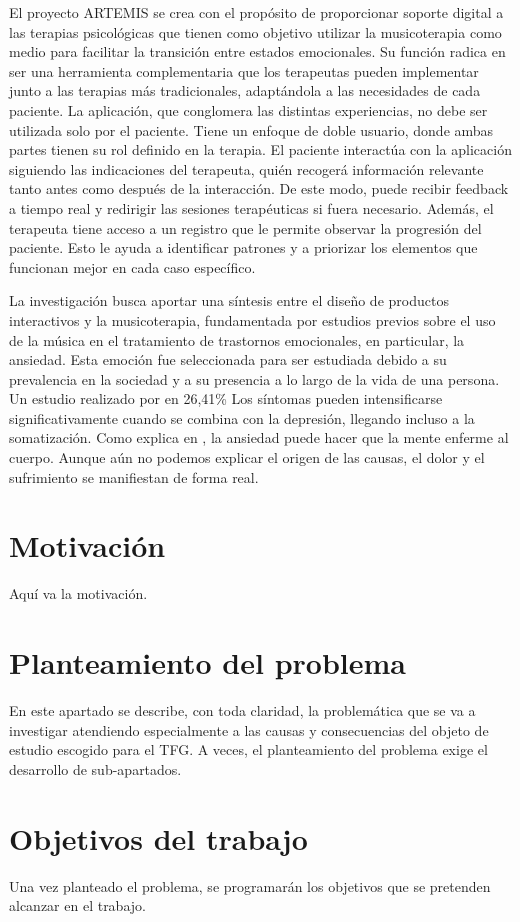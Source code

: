 El proyecto ARTEMIS se crea con el propósito de proporcionar soporte digital a las terapias psicológicas que tienen como objetivo utilizar la musicoterapia como medio para facilitar la transición entre estados emocionales. Su función radica en ser una herramienta complementaria que los terapeutas pueden implementar junto a las terapias más tradicionales, adaptándola a las necesidades de cada paciente. La aplicación, que conglomera las distintas experiencias, no debe ser utilizada solo por el paciente. Tiene un enfoque de doble usuario, donde ambas partes tienen su rol definido en la terapia. El paciente interactúa con la aplicación siguiendo las indicaciones del terapeuta, quién recogerá información relevante tanto antes como después de la interacción. De este modo, puede recibir feedback a tiempo real y redirigir las sesiones terapéuticas si fuera necesario. Además, el terapeuta tiene acceso a un registro que le permite observar la progresión del paciente. Esto le ayuda a identificar patrones y a priorizar los elementos que funcionan mejor en cada caso específico.

La investigación busca aportar una síntesis entre el diseño de productos interactivos y la musicoterapia, fundamentada por estudios previos sobre el uso de la música en el tratamiento de trastornos emocionales, en particular, la ansiedad. Esta emoción fue seleccionada para ser estudiada debido a su prevalencia en la sociedad y a su presencia a lo largo de la vida de una persona. Un estudio realizado por en  26,41\% Los síntomas pueden intensificarse significativamente cuando se combina con la depresión, llegando incluso a la somatización. Como explica \citeauthor{CJI:2017} en \citeyear{CJI:2017}, la ansiedad puede hacer que la mente enferme al cuerpo. Aunque aún no podemos explicar el origen de las causas, el dolor y el sufrimiento se manifiestan de forma real.



\section{Motivación}

Aquí va la motivación.

\section{Planteamiento del problema}

En este apartado se describe, con toda claridad, la problemática que se va a investigar atendiendo especialmente a las causas y consecuencias del objeto de estudio escogido para el TFG. A veces, el planteamiento del problema exige el desarrollo de sub-apartados.

\section{Objetivos del trabajo}

Una vez planteado el problema, se programarán los objetivos que se pretenden alcanzar en el trabajo.